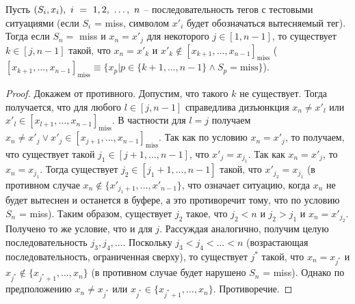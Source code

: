 \begin{lemma}\label{lemma_latest_existance}
  Пусть $(S_i, x_i),~i~=~1,\\2,~\dots,~n$ -- последовательность тегов с
  тестовыми ситуациями (если $S_i$ = miss, символом $x'_i$ будет обозначаться
  вытесняемый тег). Тогда если $S_n = $ miss и $x_n = x'_j$ для некоторого $j \in
  [1, n-1]$, то существует $k \in [j, n-1]$ такой, что $x_n = x'_k$
  и $x'_k \notin [x_{k+1}, \dots, x_{n-1}]_{\mbox{miss}}$
  ($[x_{k+1}, \dots, x_{n-1}]_{\mbox{miss}} \equiv \{x_p |
  p \in \{k+1, \dots, n-1\} \wedge S_p = \mbox{miss}\}$).
\end{lemma}
\begin{proof}
  Докажем от противного. Допустим, что такого $k$ не существует.
  Тогда получается, что для любого $l \in [j,n-1]$ справедлива дизъюнкция
  $x_n \neq x'_l$ или $x'_l \in [x_{l+1}, \dots,
  x_{n-1}]_{\mbox{miss}}$. В частности для $l = j$ получаем $x_n
  \neq x'_j \vee x'_j \in [x_{j+1}, \dots, x_{n-1}]_{\mbox{miss}}$.
  Так как по условию $x_n = x'_j$, то получаем, что существует такой
  $j_1 \in [j+1, \dots, n-1]$, что $x'_j = x_{j_1}$. Так как $x_n =
  x'_j$, то $x_n = x_{j_1}$. Тогда существует $j_2 \in [j_1+1, \dots,
  n-1]$ такой, что $x'_{j_2} = x_{j_1}$ (в противном случае $x_n
  \notin \{x'_{j_1+1}, \dots, x'_{n-1}\}$, что означает ситуацию,
  когда $x_n$ не будет вытеснен и останется в буфере, а это
  противоречит тому, что по условию $S_n$ = miss). Таким образом,
  существует $j_2$ такое, что $j_2 < n$ и $j_2 > j_1$ и $x_n =
  x'_{j_2}$. Получено то же условие, что и для $j$. Рассуждая
  аналогично, получим целую последовательность $j_3, j_4, \dots$.
  Поскольку $j_3 < j_4 < \dots < n$ (возрастающая
  последовательность, ограниченная сверху), то существует $j^*$
  такой, что $x_n = x_{j^*}$ и $x_{j^*} \notin \{x_{j^* + 1}, \dots,
  x_n\}$ (в противном случае будет нарушено $S_n$ = miss). Однако
  по предположению $x_n \neq x_{j^*}$ или $x_{j^*} \in \{x_{j^* + 1}, \dots,
  x_n\}$. Противоречие.
\end{proof}

